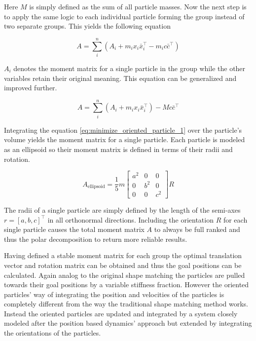 Here $M$ is simply defined as the sum of all particle masses. Now the next step is to apply the same logic to each individual particle forming the group instead of two separate groups. This yields the following equation

\begin{equation}
A = \sum\limits_i^n (A_i + m_ix_i\bar{x}_i^\top-m_ic\bar{c}^\top)
\end{equation}

$A_i$ denotes the moment matrix for a single particle in the group while the other variables retain their original meaning. This equation can be generalized and improved further.

\begin{equation}
A = \sum\limits_i^n (A_i + m_ix_i\bar{x}_i^\top) - Mc\bar{c}^\top
\end{equation}

Integrating the equation \ref{eq:minimize_oriented_particle_1} over the particle's volume yields the moment matrix for a single particle. Each particle is modeled as an ellipsoid so their moment matrix is defined in terms of their radii and rotation.

\begin{equation}
A_{\text{ellipsoid}} = \frac{1}{5}m \begin{bmatrix} a^2 & 0 & 0 \\ 0 & b^2 & 0 \\ 0 & 0 & c^2  \end{bmatrix} R
\end{equation}

The radii of a single particle are simply defined by the length of the semi-axes $r = [a,b,c]^\top$ in all orthonormal directions. Including the orientation $R$ for each single particle causes the total moment matrix $A$ to always be full ranked and thus the polar decomposition to return more reliable results.

Having defined a stable moment matrix for each group the optimal translation vector and rotation matrix can be obtained and thus the goal positions can be calculated. Again analog to the original shape matching the particles are pulled towards their goal positions by a variable stiffness fraction. However the oriented particles' way of integrating the position and velocities of the particles is completely different from the way the traditional shape matching method works. Instead the oriented particles are updated and integrated by a system closely modeled after the position based dynamics' approach but extended by integrating the orientations of the particles.

